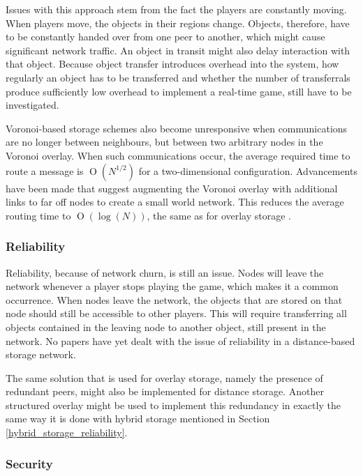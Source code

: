 \documentclass[10pt,a4paper,journal,cspaper,compsoc]{IEEEtran}
\providecommand{\OO}[1]{\operatorname{O}\left(#1\right)}
\begin{document}
Issues with this approach stem from the fact the players are constantly moving. When players move, the objects in their regions change. Objects,
therefore, have to be constantly handed over from one peer to another, which might cause significant network traffic. An object in transit might also
delay interaction with that object. Because object transfer introduces overhead into the system, how regularly an object has to be transferred and
whether the number of transferrals produce sufficiently low overhead to implement a real-time game, still have to be investigated.

Voronoi-based storage schemes also become unresponsive when communications are no longer between neighbours, but between two arbitrary nodes in the
Voronoi overlay. When such communications occur, the average required time to route a message is $\OO{N^{1/2}}$ for a two-dimensional configuration.
Advancements have been made that suggest augmenting the Voronoi overlay with additional links to far off nodes to create a small world network. This
reduces the average routing time to $\OO{\log{(N)}}$, the same as for overlay storage \cite{Steiner_voronoi_shortcuts}.

\subsubsection{Reliability}

Reliability, because of network churn, is still an issue. Nodes will leave the network whenever a player stops playing the game, which makes it a
common occurrence. When nodes leave the network, the objects that are stored on that node should still be accessible to other players. This will
require transferring all objects contained in the leaving node to another object, still present in the network. No papers have yet dealt with the
issue of reliability in a distance-based storage network.

The same solution that is used for overlay storage, namely the presence of redundant peers, might also be implemented for distance storage. Another
structured overlay might be used to implement this redundancy in exactly the same way it is done with hybrid storage mentioned in Section
\ref{hybrid_storage_reliability}.

\subsubsection{Security}
\label{distance_based_storage_security}
\end{document}
